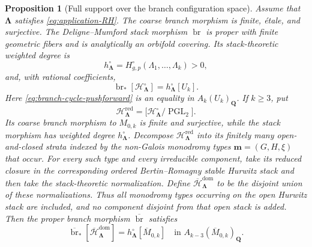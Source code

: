 \documentclass[10pt,a4paper]{amsart}
\newtheorem{proposition}[theorem]{Proposition}
\numberwithin{equation}{section}
\begin{document}
\begin{proposition}[Full support over the branch configuration space]
\label{prop:branch-map-full-support}
Assume that $\boldsymbol\Lambda$ satisfies
\eqref{eq:application-RH}.  The coarse branch morphism is finite, \'etale,
and surjective.  The Deligne--Mumford stack morphism
$\operatorname{br}$ is proper with finite geometric fibers and is
analytically an orbifold covering.  Its stack-theoretic weighted degree is
\[
 h^\circ_{\boldsymbol\Lambda}
 =H^\circ_{g,p}(\Lambda_1,\ldots,\Lambda_k)>0,
\]
and, with rational coefficients,
\begin{equation}\label{eq:branch-cycle-pushforward}
 \operatorname{br}_*[\mathcal H^\circ_{\boldsymbol\Lambda}]
 =h^\circ_{\boldsymbol\Lambda}[U_k].
\end{equation}
Here \eqref{eq:branch-cycle-pushforward} is an equality in
$A_k(U_k)_{\mathbf Q}$.  If $k\geq3$, put
\[
 \mathcal H^{\mathrm{red}}_{\boldsymbol\Lambda}
 =\bigl[\mathcal H^\circ_{\boldsymbol\Lambda}/
        \operatorname{PGL}_2\bigr].
\]
Its coarse branch morphism to $M_{0,k}$ is finite and surjective, while the
stack morphism has weighted degree $h^\circ_{\boldsymbol\Lambda}$.
Decompose $\mathcal H^{\mathrm{red}}_{\boldsymbol\Lambda}$ into its
finitely many open-and-closed strata indexed by the non-Galois monodromy
types $\mathbf m=(G,H,\xi)$ that occur.  For every such type and every
irreducible component, take its reduced closure in the corresponding
ordered Bertin--Romagny stable Hurwitz stack and then take the
stack-theoretic normalization.  Define
$\overline{\mathcal H}^{\mathrm{dom}}_{\boldsymbol\Lambda}$ to be the
disjoint union of these normalizations.  Thus all monodromy types occurring
on the open Hurwitz stack are included, and no component disjoint from that
open stack is added.  Then the proper branch morphism
$\overline{\operatorname{br}}$ satisfies
\begin{equation}\label{eq:compactified-branch-cycle}
 \overline{\operatorname{br}}_*
 [\overline{\mathcal H}^{\mathrm{dom}}_{\boldsymbol\Lambda}]
 =h^\circ_{\boldsymbol\Lambda}[\overline M_{0,k}]
 \quad\text{in }A_{k-3}(\overline M_{0,k})_{\mathbf Q}.
\end{equation}
\end{proposition}
\end{document}

